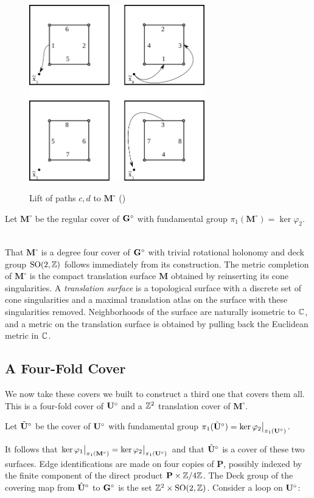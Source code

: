 \documentclass[]{article}
\def\bM{\mathbf{M}}
\def\bMs{\mathbf{M}^\circ}
\def\btUs{\btU^\circ}
\def\SO{\mathrm{SO}}
\begin{document}
\begin{figure}[H]
\centering
\includegraphics[width=3in]{monogroup.png}
\label{fig:arbitrarylift}
\caption{Lift of paths $c,d$ to $\bMs$ ()}
\end{figure}

\begin{Def}
Let $\bMs$ be the regular cover of $\mathbf{G}^\circ$ with fundamental group $\pi_1(\bMs)=\ker\varphi_2$.
\end{Def}
\\
That $\bMs$ is a degree four cover of $\mathbf{G}^\circ$ with trivial rotational holonomy and deck group $\SO(2,\ZZ)$ follows immediately from its construction. The metric completion of $\bMs$ is the compact translation surface $\bM$ obtained by reinserting its cone singularities. A \emph{translation surface} is a topological surface with a discrete set of cone singularities and a maximal translation atlas on the surface with these singularities removed. Neighborhoods of the surface are naturally isometric to $\mathbb{C}$, and a metric on the translation surface is obtained by pulling back the Euclidean metric in $\mathbb{C}$.


\subsection{A Four-Fold Cover}
We now take these covers we built to construct a third one that covers them all. This is a four-fold cover of $\mathbf{U}^\circ$ and a $\mathbb{Z}^2$ translation cover of $\bMs$. 
\begin{Def}
Let $\btUs$ be the cover of $\mathbf{U}^\circ$ with fundamental group $\pi_1(\btUs)=\ker\varphi_2\big\vert_{\pi_1(\bUs)}$.
\end{Def}

It follows that $\ker\varphi_1\big\vert_{\pi_1(\bMs)}=\ker\varphi_2\big\vert_{\pi_1(\bUs)}$ and that $\btUs$ is a cover of these two surfaces. Edge identifications are made on four copies of $\mathbf{P}$, possibly indexed by the finite component of the direct product $\mathbf{P}\times\mathbb{Z}/4\mathbb{Z}$. The Deck group of the covering map from $\btUs$ to $\mathbf{G}^\circ$ is the set $\ZZ^2\times \SO(2,\ZZ)$. Consider a loop on $\mathbf{U}^\circ$:
\end{document}
